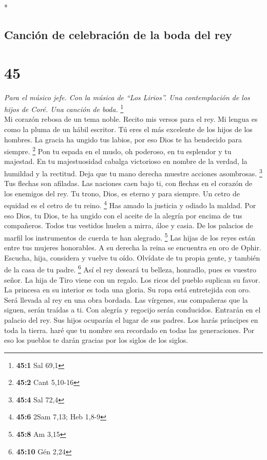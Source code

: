 \begin{paracol}{2}
\begin{otherlanguage}{english}
\end{otherlanguage}

\switchcolumn[0]*

\hypertarget{canciuxf3n-de-celebraciuxf3n-de-la-boda-del-rey}{%
\subsection{Canción de celebración de la boda del
rey}\label{canciuxf3n-de-celebraciuxf3n-de-la-boda-del-rey}}

\hypertarget{section-88}{%
\section{45}\label{section-88}}

\emph{Para el músico jefe. Con la música de ``Los Lirios''. Una
contemplación de los hijos de Coré. Una canción de boda.} \footnote{\textbf{45:1}
  Sal 69,1}\\
 Mi corazón rebosa de un tema noble. Recito mis versos
para el rey. Mi lengua es como la pluma de un hábil escritor.
 Tú eres el más excelente de los hijos de los hombres. La
gracia ha ungido tus labios, por eso Dios te ha bendecido para siempre.
\footnote{\textbf{45:2} Cant 5,10-16}  Pon tu espada en el
muslo, oh poderoso, en tu esplendor y tu majestad.  En tu
majestuosidad cabalga victorioso en nombre de la verdad, la humildad y
la rectitud. Deja que tu mano derecha muestre acciones asombrosas.
\footnote{\textbf{45:4} Sal 72,4}  Tus flechas son
afiladas. Las naciones caen bajo ti, con flechas en el corazón de los
enemigos del rey.  Tu trono, Dios, es eterno y para
siempre. Un cetro de equidad es el cetro de tu reino. \footnote{\textbf{45:6}
  2Sam 7,13; Heb 1,8-9}  Has amado la justicia y odiado la
maldad. Por eso Dios, tu Dios, te ha ungido con el aceite de la alegría
por encima de tus compañeros.  Todos tus vestidos huelen a
mirra, áloe y casia. De los palacios de marfil los instrumentos de
cuerda te han alegrado. \footnote{\textbf{45:8} Am 3,15} 
Las hijas de los reyes están entre tus mujeres honorables. A su derecha
la reina se encuentra en oro de Ophir.  Escucha, hija,
considera y vuelve tu oído. Olvídate de tu propia gente, y también de la
casa de tu padre. \footnote{\textbf{45:10} Gén 2,24}  Así
el rey deseará tu belleza, honradlo, pues es vuestro señor.
 La hija de Tiro viene con un regalo. Los ricos del
pueblo suplican su favor.  La princesa en su interior es
toda una gloria. Su ropa está entretejida con oro.  Será
llevada al rey en una obra bordada. Las vírgenes, sus compañeras que la
siguen, serán traídas a ti.  Con alegría y regocijo serán
conducidos. Entrarán en el palacio del rey.  Sus hijos
ocuparán el lugar de sus padres. Los harás príncipes en toda la tierra.
 haré que tu nombre sea recordado en todas las
generaciones. Por eso los pueblos te darán gracias por los siglos de los
siglos.


\end{paracol}
